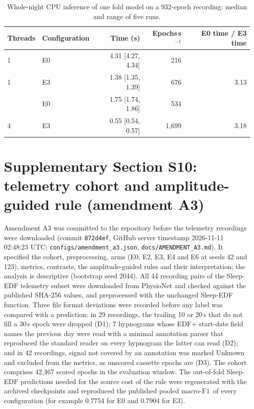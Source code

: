 \documentclass[10pt,a4paper]{article}
\newcommand{\mf}{\ensuremath{\mathrm{macro\text{-}F1}}}
\begin{document}
\begin{table}[H]
\centering\small
\caption{Whole-night CPU inference of one fold model on a 932-epoch recording: median and range of five
runs.}
\label{tab:sup_cpu}
\begin{tabular}{llrrr}
\toprule
Threads & Configuration & Time (s) & Epochs\,s$^{-1}$ & E0 time / E3 time \\
\midrule
1 & E0 & 4.31 [4.27, 4.34] & 216 & \\
1 & E3 & 1.38 [1.35, 1.39] & 676 & 3.13 \\
\addlinespace
4 & E0 & 1.75 [1.74, 1.86] & 534 & \\
4 & E3 & 0.55 [0.54, 0.57] & 1{,}699 & 3.18 \\
\bottomrule
\end{tabular}
\end{table}

\section*{Supplementary Section S10: telemetry cohort and amplitude-guided rule (amendment A3)}
\label{sec:sup_telemetry}

Amendment A3 was committed to the repository before the telemetry recordings were downloaded (commit
\texttt{872d4ef}, GitHub server timestamp 2026-11-11 02:48:23 UTC; \nolinkurl{configs/amendment_a3.json},
\nolinkurl{docs/AMENDMENT_A3.md}). It specified the cohort, preprocessing, arms (E0, E2, E3, E4 and E6 at seeds 42
and 123), metrics, contrasts, the amplitude-guided rules and their interpretation; the analysis is descriptive
(bootstrap seed 2044). All 44 recording pairs of the Sleep-EDF telemetry subset were downloaded from PhysioNet and
checked against the published SHA-256 values, and preprocessed with the unchanged Sleep-EDF function. Three file
format deviations were recorded before any label was compared with a prediction: in 29 recordings, the trailing
10 or 20\,s that do not fill a 30\,s epoch were dropped (D1); 7 hypnograms whose EDF+ start-date field names the
previous day were read with a minimal annotation parser that reproduced the standard reader on every hypnogram the
latter can read (D2); and in 42 recordings, signal not covered by an annotation was marked Unknown and excluded
from the metrics, as unscored cassette epochs are (D3). The cohort comprises 42{,}467 scored epochs in the
evaluation window. The out-of-fold Sleep-EDF predictions needed for the source cost of the rule were regenerated
with the archived checkpoints and reproduced the published pooled \mf\ of every configuration
(for example 0.7754 for E0 and 0.7904 for E3).
\end{document}
